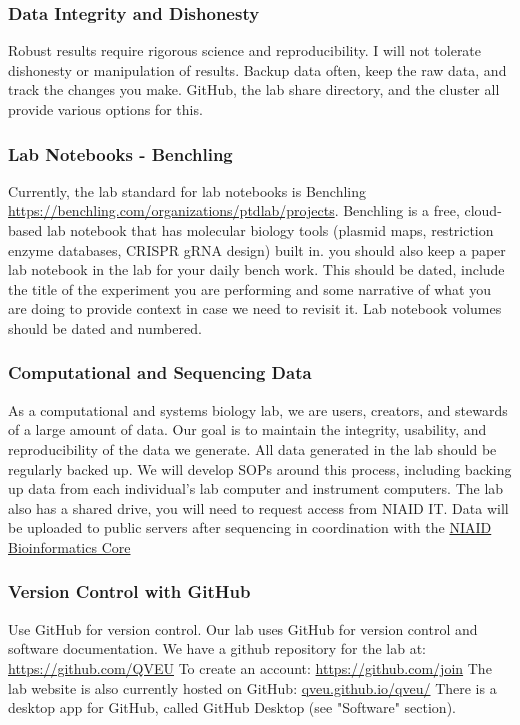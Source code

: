 \documentclass[10pt, letterpaper, twocolumn]{article} %
\begin{document}
\subsubsection{Data Integrity and Dishonesty}
Robust results require rigorous science and reproducibility. I will not tolerate dishonesty or manipulation of results. Backup data often, keep the raw data, and track the changes you make. GitHub, the lab share directory, and the cluster all provide various options for this.

\subsubsection{Lab Notebooks - Benchling}
Currently, the lab standard for lab notebooks is Benchling \href{https://benchling.com/organizations/ptdlab/projects}{https://benchling.com/organizations/ptdlab/projects}. Benchling is a free, cloud-based lab notebook that has molecular biology tools (plasmid maps, restriction enzyme databases, CRISPR gRNA design) built in. you should also keep a paper lab notebook in the lab for your daily bench work. This should be dated, include the title of the experiment you are performing and some narrative of what you are doing to provide context in case we need to revisit it. Lab notebook volumes should be dated and numbered.

\subsubsection{Computational and Sequencing Data}
As a computational and systems biology lab, we are users, creators, and stewards of a large amount of data. Our goal is to maintain the integrity, usability, and reproducibility of the data we generate. All data generated in the lab should be regularly backed up. We will develop SOPs around this process, including backing up data from each individual's lab computer and instrument computers. The lab also has a shared drive, you will need to request access from NIAID IT. Data will be uploaded to public servers after sequencing in coordination with the \href{https://bioinformatics.niaid.nih.gov/}{NIAID Bioinformatics Core}

\subsubsection{Version Control with GitHub}
Use GitHub for version control. Our lab uses GitHub for version control and software documentation. We have a github repository for the lab at: \href{https://github.com/QVEU}{https://github.com/QVEU}
To create an account: \href{https://github.com/join}{https://github.com/join}
The lab website is also currently hosted on GitHub: \href{https://qveu.github.io/QVEU/}{qveu.github.io/qveu/}
\newline
There is a desktop app for GitHub, called GitHub Desktop (see "Software" section).
\end{document}
